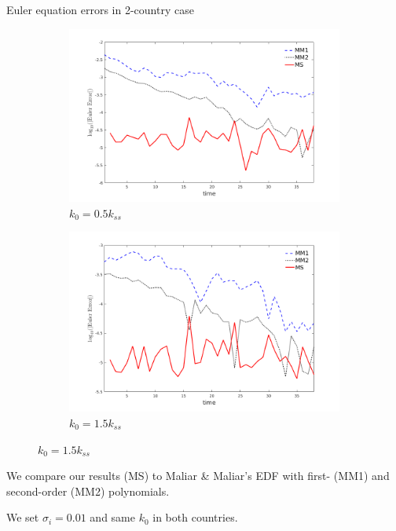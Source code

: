 \documentclass{beamer}
\begin{document}
\begin{frame}{Euler equation errors in 2-country case}

    \begin{figure}[htpb]
        \centering
        \label{fig-eulererrors_2countries_baseline}
        \begin{subfigure}[b]{0.50\textwidth}
            \includegraphics[width=\textwidth]{two_country_0_1_k0_0_5_euler_errors}
            \caption{$k_0=0.5 k_{ss}$}
            \label{two_country_k_0_low}
        \end{subfigure}
        \begin{subfigure}[b]{0.48\textwidth}
            \includegraphics[width=\textwidth]{two_country_0_1_k0_1_5_euler_errors}
            \caption{$k_0=1.5 k_{ss}$}
            \label{two_country_k_0_high}
        \end{subfigure}
    \end{figure}

    \small
    We compare our results (MS) to Maliar \& Maliar's EDF with first- (MM1) and second-order (MM2)
    polynomials.

    \medskip
    We set $\sigma_i = 0.01$ and same $k_0$ in both countries.
    
\end{frame}
\end{document}
